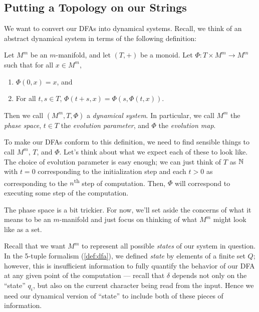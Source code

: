\documentclass{fkpaper}
\begin{document}
\begin{multicols}{2}
  \subsection{Putting a Topology on our Strings}
  We want to convert our DFAs into dynamical systems. Recall, we think
  of an abstract dynamical system in terms of the following definition:
  \begin{definition}
    Let $M^m$ be an $m$-manifold, and let $(T, +)$ be a monoid. Let
    $\Phi : T \times M^m \to M^m$ such that for all $x \in M^m$,
    \begin{enumerate}
      \item $\Phi(0, x) = x$, and
      \item For all $t,s \in T$, $\Phi(t + s, x) = \Phi(s, \Phi(t, x))$.
    \end{enumerate}
    Then we call $(M^m, T, \Phi)$ a \emph{dynamical system}. In
    particular, we call $M^m$ the \emph{phase space}, $t \in T$ the
    \emph{evolution parameter}, and $\Phi$ the \emph{evolution map}.
  \end{definition}
  To make our DFAs conform to this definition, we need to find sensible
  things to call $M^m$, $T$, and $\Phi$. Let's think about what we
  expect each of these to look like. The choice of evolution parameter
  is easy enough; we can just think of $T$ as $\mathbb{N}$ with $t=0$
  corresponding to the initialization step and each $t > 0$ as
  corresponding to the $n$\textsuperscript{th} step of computation.
  Then, $\Phi$ will correspond to executing some step of the
  computation.

  The phase space is a bit trickier. For now, we'll set aside the
  concerns of what it means to be an $m$-manifold and just focus on
  thinking of what $M^m$ might look like as a set.

  Recall that we want $M^m$ to represent all possible \emph{states} of
  our system in question. In the 5-tuple formalism (\cref{def:dfa}), we
  defined \emph{state} by elements of a finite set $Q$; however, this is
  insufficient information to fully quantify the behavior of our DFA at
  any given point of the computation --- recall that $\delta$ depends
  not only on the ``state'' $q_i$, but also on the current character
  being read from the input. Hence we need our dynamical version of
  ``state'' to include both of these pieces of information.


\end{multicols}
\end{document}

